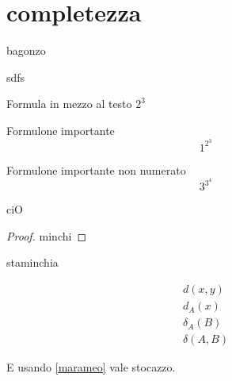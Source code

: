 \section{completezza}
bagonzo

sdfs

Formula in mezzo al testo $2^3$

Formulone importante
\begin{equation}
1^{2^3}
\end{equation}

Formulone importante non numerato
\begin{equation*}
3^{3^4}
\end{equation*}

\begin{theorem}\label{marameo}
ciO
\end{theorem}
\begin{proof}
minchi
\end{proof}

\begin{remark}
staminchia
\end{remark}

\begin{align}
d(x,y)\\
d_A(x)\\
\delta_A(B)\\
\delta(A,B)
\end{align}

E usando \cref{marameo} vale stocazzo.